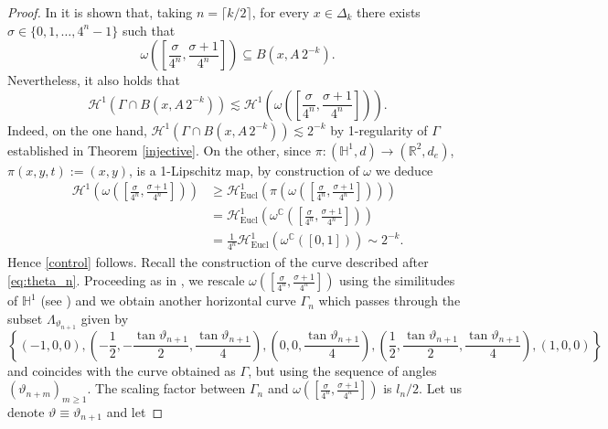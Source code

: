 \documentclass[12pt]{amsart}
\newcommand{\R}{\mathbb R}
\renewcommand{\H}{\mathbb H}
\newcommand{\C}{\mathbb C}
\renewcommand{\theta}{\vartheta}
\numberwithin{equation}{section}
\theoremstyle{plain}
\theoremstyle{definition}
\theoremstyle{remark}
\begin{document}
\begin{proof}
 In \cite[Section 4]{Juillet} it is shown
 that, taking $n=\lceil k/2\rceil$, for every $x\in\Delta_k$ there exists $\sigma\in\{0,1,\dots, 4^n-1\}$ such that\begin{equation}\label{pieceofcurve}\omega\left(\left[\frac{\sigma}{4^n},\frac{\sigma+1}{4^n}\right]\right)\subseteq B(x,A\,2^{-k}).\end{equation}
 Nevertheless, it also holds that 
 \begin{equation}\label{control}\mathcal H^1(\Gamma\cap B(x, A\,2^{-k}))\lesssim\mathcal H^1\left(\omega\left(\left[\frac{\sigma}{4^n},\frac{\sigma+1}{4^n}\right]\right)\right).\end{equation}
 Indeed, on the one hand, $\mathcal H^1(\Gamma\cap B(x, A\,2^{-k}))\lesssim 2^{-k}$ by 1-regularity of $\Gamma$ established in Theorem \ref{injective}. On the other, since $\pi:(\H^1,d)\to(\R^2,d_e)$, $\pi(x,y,t):=(x,y)$, is a 1-Lipschitz map, by construction of $\omega$ we deduce\[\begin{split}\mathcal H^1\left(\omega\left(\left[\frac{\sigma}{4^n},\frac{\sigma+1}{4^n}\right]\right)\right)&\geq \mathcal H^1_{\mathrm{Eucl}}\left(\pi\left(\omega\left(\left[\frac{\sigma}{4^n},\frac{\sigma+1}{4^n}\right]\right)\right)\right)\\&=\mathcal H^1_{\mathrm{Eucl}}\left(\omega^\C\left(\left[\frac{\sigma}{4^n},\frac{\sigma+1}{4^n}\right]\right)\right)\\&= \frac{1}{4^n}\mathcal H^1_{\mathrm{Eucl}}\left(\omega^\C\left([0,1]\right)\right)\sim 2^{-k}.\end{split}\]
 Hence \eqref{control} follows. Recall the construction 
 of the curve described after \eqref{eq:theta_n}.
 Proceeding as in \cite{Juillet}, we rescale $\omega\left(\left[\frac{\sigma}{4^n},\frac{\sigma+1}{4^n}\right]\right)$ using the similitudes of $\H^1$ (see \cite[Section 1.3]{Juillet}) and we obtain another horizontal curve $\Gamma_n$ which passes through the subset $\Lambda_{\theta_{n+1}}$ given by
 {\small\begin{equation}\label{eq:Lambda5Pts}\left\{(-1,0,0), \left(-\frac{1}{2},-\frac{\tan \theta_{n+1}}{2},\frac{\tan \theta_{n+1}}{4}\right), \left(0,0,\frac{\tan \theta_{n+1}}{4}\right), \left(\frac{1}{2},\frac{\tan \theta_{n+1}}{2},\frac{\tan \theta_{n+1}}{4}\right), (1,0,0)\right\}\end{equation}}and coincides with the curve obtained as $\Gamma$, but using the sequence of angles $(\theta_{n+m})_{m\geq 1}$. The scaling factor between $\Gamma_n$ and $\omega\left(\left[\frac{\sigma}{4^n},\frac{\sigma+1}{4^n}\right]\right)$ is $l_n/2$. Let us denote $\theta\equiv\theta_{n+1}$ and let

\end{proof}
\end{document}
